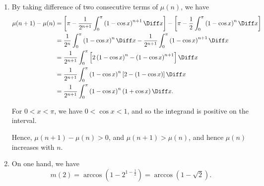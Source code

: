 \begin{enumerate}
          \begin{enumerate}
              \item By taking difference of two consecutive terms of \(\mu(n)\), we have
                    \begin{align*}
                        \mu(n + 1) - \mu(n) & = \left[\pi - \frac{1}{2^{n + 1}} \int_{0}^{\pi} \left(1 - \cos x \right)^{n + 1} \Diff x\right] - \left[\pi - \frac{1}{2^{}} \int_{0}^{\pi} \left(1 - \cos x \right)^{n} \Diff x\right] \\
                                            & = \frac{1}{2^n} \int_{0}^{\pi} \left(1 - \cos x\right)^n \Diff x - \frac{1}{2^{n + 1}} \int_{0}^{\pi} \left(1 - \cos x\right)^{n + 1} \Diff x                                            \\
                                            & = \frac{1}{2^{n + 1}} \int_{0}^{\pi} \left[2 \left(1 - \cos x\right)^{n} - \left(1 - \cos x\right)^{n + 1}\right] \Diff x                                                                \\
                                            & = \frac{1}{2^{n + 1}} \int_{0}^{\pi} \left(1 - \cos x\right)^{n} \left[2 - \left(1 - \cos x\right)\right] \Diff x                                                                        \\
                                            & = \frac{1}{2^{n + 1}} \int_{0}^{\pi} \left(1 - \cos x\right)^{n} \left(1 + \cos x\right) \Diff x.
                    \end{align*}

                    For \(0 < x < \pi\), we have \(0 < \cos x < 1\), and so the integrand is positive on the interval.

                    Hence, \(\mu(n + 1) - \mu(n) > 0\), and \(\mu(n + 1) > \mu(n)\), and hence \(\mu(n)\) increases with \(n\).

              \item On one hand, we have
                    \[
                        m(2) = \arccos \left(1 - 2^{1 - \frac{1}{2}}\right) = \arccos \left(1 - \sqrt{2}\right).
                    \]


\end{enumerate}
\end{enumerate}
